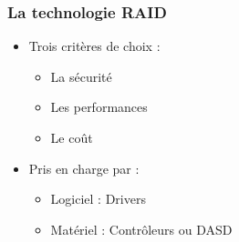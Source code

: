 \begin{frame}
\frametitle{La technologie RAID}
\begin{itemize}
\item Trois critères de choix :
\begin{itemize}
\item La sécurité
\item Les performances
\item Le coût
\end{itemize}
\item Pris en charge par :
\begin{itemize}
\item Logiciel : Drivers
\item Matériel : Contrôleurs ou DASD
\end{itemize}
\end{itemize}
\end{frame}

